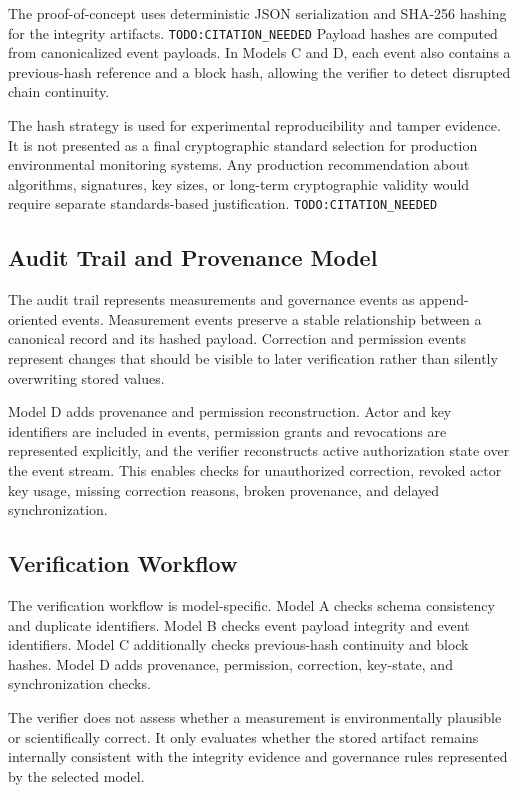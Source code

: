 The proof-of-concept uses deterministic JSON serialization and SHA-256 hashing for the integrity artifacts. \texttt{TODO:CITATION\_NEEDED} Payload hashes are computed from canonicalized event payloads. In Models C and D, each event also contains a previous-hash reference and a block hash, allowing the verifier to detect disrupted chain continuity.

The hash strategy is used for experimental reproducibility and tamper evidence. It is not presented as a final cryptographic standard selection for production environmental monitoring systems. Any production recommendation about algorithms, signatures, key sizes, or long-term cryptographic validity would require separate standards-based justification. \texttt{TODO:CITATION\_NEEDED}

\subsection{Audit Trail and Provenance Model}

The audit trail represents measurements and governance events as append-oriented events. Measurement events preserve a stable relationship between a canonical record and its hashed payload. Correction and permission events represent changes that should be visible to later verification rather than silently overwriting stored values.

Model D adds provenance and permission reconstruction. Actor and key identifiers are included in events, permission grants and revocations are represented explicitly, and the verifier reconstructs active authorization state over the event stream. This enables checks for unauthorized correction, revoked actor key usage, missing correction reasons, broken provenance, and delayed synchronization.

\subsection{Verification Workflow}

The verification workflow is model-specific. Model A checks schema consistency and duplicate identifiers. Model B checks event payload integrity and event identifiers. Model C additionally checks previous-hash continuity and block hashes. Model D adds provenance, permission, correction, key-state, and synchronization checks.

The verifier does not assess whether a measurement is environmentally plausible or scientifically correct. It only evaluates whether the stored artifact remains internally consistent with the integrity evidence and governance rules represented by the selected model.
